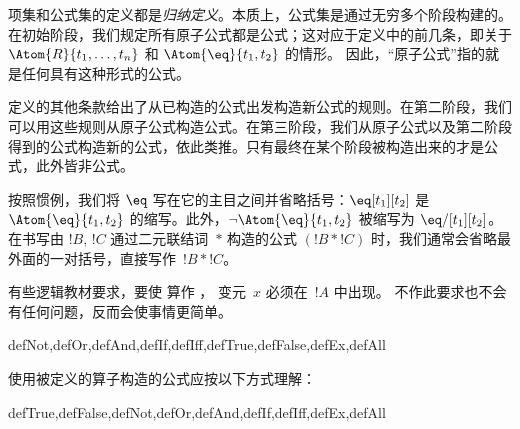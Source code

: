 \documentclass[../../../include/open-logic-section]{subfiles}
\begin{document}
\begin{explain}
项集和公式集的定义都是\emph{归纳定义}。本质上，公式集是通过无穷多个阶段构建的。在初始阶段，我们规定所有原子公式都是公式；这对应于定义中的前几条，即关于
%
%
$\Atom{R}{t_1,\dots,t_n}$ 和 $\Atom{\eq}{t_1,t_2}$ 的情形。
因此，“原子公式”指的就是任何具有这种形式的公式。

定义的其他条款给出了从已构造的公式出发构造新公式的规则。在第二阶段，我们可以用这些规则从原子公式构造公式。在第三阶段，我们从原子公式以及第二阶段得到的公式构造新的公式，依此类推。只有最终在某个阶段被构造出来的才是公式，此外皆非公式。
\end{explain}

按照惯例，我们将 $\eq$ 写在它的主目之间并省略括号：$\eq[t_1][t_2]$ 是
$\Atom{\eq}{t_1,t_2}$ 的缩写。此外，$\lnot \Atom{\eq}{t_1,t_2}$ 被缩写为
$\eq/[t_1][t_2]$。在书写由 $!B$, $!C$ 通过二元联结词~$\ast$ 构造的公式 $(!B \ast !C)$ 时，我们通常会省略最外面的一对括号，直接写作~$!B \ast !C$。

\begin{intro}
有些逻辑教材要求，要使
%
%
%
算作
，
变元~$x$ 必须在~$!A$ 中出现。
不作此要求也不会有任何问题，反而会使事情更简单。
\end{intro}

\begin{tagblock}{defNot,defOr,defAnd,defIf,defIff,defTrue,defFalse,defEx,defAll}
\begin{defn}
使用被定义的算子构造的公式应按以下方式理解：

\begin{tagenumerate}{defTrue,defFalse,defNot,defOr,defAnd,defIf,defIff,defEx,defAll}









\end{tagenumerate}
\end{defn}
\end{tagblock}
\end{document}
